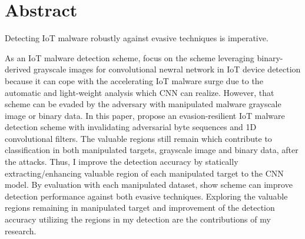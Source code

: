 \section*{Abstract}


Detecting IoT malware robustly against evasive techniques is imperative.


As an IoT malware detection scheme, \we focus on the scheme leveraging binary-derived grayscale images for convolutional newral network in IoT device detection because it can cope with the accelerating IoT malware surge due to the automatic and light-weight analysis which CNN can realize.
However, that scheme can be evaded by the adversary with manipulated malware grayscale image or binary data.
In this paper, \we propose an evasion-resilient IoT malware detection scheme with invalidating adversarial byte sequences and 1D convolutional filters.
The valuable regions still remain which contribute to classification in both manipulated targets, grayscale image and binary data, after the attacks.
Thus, I improve the detection accuracy by statically extracting/enhancing valuable region of each manipulated target to the CNN model.
By evaluation with each manipulated dataset, \we show \our scheme can improve detection performance against both evasive techniques. 
Exploring the valuable regions remaining in manipulated target and improvement of the detection accuracy utilizing the regions in my detection are the contributions of my research. 
